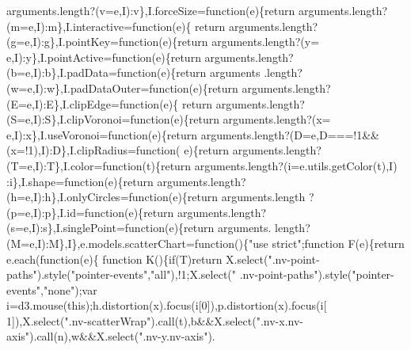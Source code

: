 \begin{DoxyCode}
      arguments.length?(v=e,I):v\},I.forceSize=\textcolor{keyword}{function}(e)\{\textcolor{keywordflow}{return} arguments.length?(m=e,I):m\},I.interactive=\textcolor{keyword}{function}(e)\{\textcolor{keywordflow}{
      return} arguments.length?(g=e,I):g\},I.pointKey=\textcolor{keyword}{function}(e)\{\textcolor{keywordflow}{return} arguments.length?(y=
      e,I):y\},I.pointActive=\textcolor{keyword}{function}(e)\{\textcolor{keywordflow}{return} arguments.length?(b=e,I):b\},I.padData=\textcolor{keyword}{function}(e)\{\textcolor{keywordflow}{return} arguments
      .length?(w=e,I):w\},I.padDataOuter=\textcolor{keyword}{function}(e)\{\textcolor{keywordflow}{return} arguments.length?(E=e,I):E\},I.clipEdge=\textcolor{keyword}{function}(e)\{\textcolor{keywordflow}{
      return} arguments.length?(S=e,I):S\},I.clipVoronoi=\textcolor{keyword}{function}(e)\{\textcolor{keywordflow}{return} arguments.length?(x=
      e,I):x\},I.useVoronoi=\textcolor{keyword}{function}(e)\{\textcolor{keywordflow}{return} arguments.length?(D=e,D===!1&&(x=!1),I):D\},I.clipRadius=\textcolor{keyword}{function}(
      e)\{\textcolor{keywordflow}{return} arguments.length?(T=e,I):T\},I.color=\textcolor{keyword}{function}(t)\{\textcolor{keywordflow}{return} arguments.length?(i=e.utils.getColor(t),I)
      :i\},I.shape=\textcolor{keyword}{function}(e)\{\textcolor{keywordflow}{return} arguments.length?(h=e,I):h\},I.onlyCircles=\textcolor{keyword}{function}(e)\{\textcolor{keywordflow}{return} arguments.length
      ?(p=e,I):p\},I.id=\textcolor{keyword}{function}(e)\{\textcolor{keywordflow}{return} arguments.length?(s=e,I):s\},I.singlePoint=\textcolor{keyword}{function}(e)\{\textcolor{keywordflow}{return} arguments.
      length?(M=e,I):M\},I\},e.models.scatterChart=\textcolor{keyword}{function}()\{\textcolor{stringliteral}{"use strict"};\textcolor{keyword}{function} F(e)\{\textcolor{keywordflow}{return} e.each(\textcolor{keyword}{function}(e)\{\textcolor{keyword}{
      function} K()\{\textcolor{keywordflow}{if}(T)\textcolor{keywordflow}{return} X.select(\textcolor{stringliteral}{".nv-point-paths"}).style(\textcolor{stringliteral}{"pointer-events"},\textcolor{stringliteral}{"all"}),!1;X.select(\textcolor{stringliteral}{"
      .nv-point-paths"}).style(\textcolor{stringliteral}{"pointer-events"},\textcolor{stringliteral}{"none"});var i=d3.mouse(\textcolor{keyword}{this});h.distortion(x).focus(i[0]),p.distortion(x).focus(i[
      1]),X.select(\textcolor{stringliteral}{".nv-scatterWrap"}).call(t),b&&X.select(\textcolor{stringliteral}{".nv-x.nv-axis"}).call(n),w&&X.select(\textcolor{stringliteral}{".nv-y.nv-axis"}).

\end{DoxyCode}
